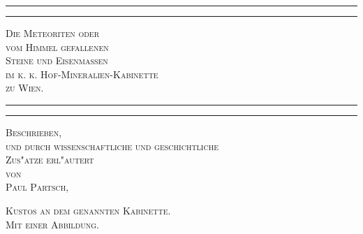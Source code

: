 \documentclass[a4paper, 11pt, oneside, polutonikogreek, german]{article}
\begin{document}
\begin{titlepage} %
	\centering %

	
	\rule{\textwidth}{1.6pt}\vspace*{-\baselineskip}\vspace*{2pt} %
	\rule{\textwidth}{0.4pt} %
	
	\vspace{1\baselineskip} %
	
	{\scshape\LARGE Die Meteoriten oder\\[1.25pt] vom Himmel gefallenen \\[1.25pt] Steine und Eisenmassen\\[1.25pt] im k. k. Hof-Mineralien-Kabinette\\[4pt] zu Wien.}
	
	\vspace{1\baselineskip} %

	\rule{\textwidth}{0.4pt}\vspace*{-\baselineskip}\vspace{3.2pt} %
	\rule{\textwidth}{1.6pt} %
	
	\vspace{1\baselineskip} %
	
	
	{\scshape Beschrieben,\\ und durch wissenschaftliche und geschichtliche \\ Zus"atze erl"autert \\ von \\ Paul Partsch,} %
	
	\vspace*{1\baselineskip} %
	
    {\scshape\scriptsize Kustos an dem genannten Kabinette. \\ Mit einer Abbildung.} %
    
    \vspace*{\fill}


\end{titlepage}
\end{document}
